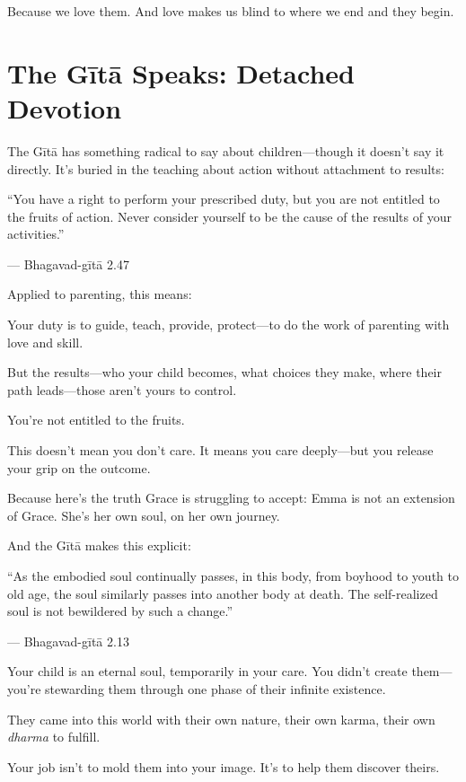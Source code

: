 \documentclass[11pt,twoside]{book}
\begin{document}
Because we love them. And love makes us blind to where we end and they begin.

\section*{The Gītā Speaks: Detached Devotion}

The Gītā has something radical to say about children—though it doesn't say it directly. It's buried in the teaching about action without attachment to results:

\begin{pullquote}
``You have a right to perform your prescribed duty, but you are not entitled to the fruits of action. Never consider yourself to be the cause of the results of your activities.''

--- Bhagavad-gītā 2.47
\end{pullquote}

Applied to parenting, this means:

Your duty is to guide, teach, provide, protect—to do the work of parenting with love and skill.

But the results—who your child becomes, what choices they make, where their path leads—those aren't yours to control.

You're not entitled to the fruits.

This doesn't mean you don't care. It means you care deeply—but you release your grip on the outcome.

Because here's the truth Grace is struggling to accept: Emma is not an extension of Grace. She's her own soul, on her own journey.

And the Gītā makes this explicit:

\begin{pullquote}
``As the embodied soul continually passes, in this body, from boyhood to youth to old age, the soul similarly passes into another body at death. The self-realized soul is not bewildered by such a change.''

--- Bhagavad-gītā 2.13
\end{pullquote}

Your child is an eternal soul, temporarily in your care. You didn't create them—you're stewarding them through one phase of their infinite existence.

They came into this world with their own nature, their own karma, their own \emph{dharma} to fulfill.

Your job isn't to mold them into your image. It's to help them discover theirs.
\end{document}
